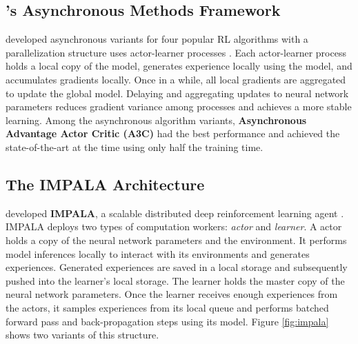 \subsection{'s Asynchronous Methods Framework}
\citeauthor{AsynchronousMethodsDeep_Mnih.Badia.ea_2016} developed asynchronous variants for four popular RL algorithms with a parallelization structure uses actor-learner processes \cite{AsynchronousMethodsDeep_Mnih.Badia.ea_2016}.
Each actor-learner process holds a local copy of the model, generates experience locally using the model, and accumulates gradients locally.
Once in a while, all local gradients are aggregated to update the global model.
Delaying and aggregating updates to neural network parameters reduces gradient variance among processes and achieves a more stable learning.
Among the asynchronous algorithm variants, \textbf{Asynchronous Advantage Actor Critic (A3C)} had the best performance and achieved the state-of-the-art at the time using only half the training time.

\subsection{The IMPALA Architecture} \label{sec:impala}
\citeauthor{IMPALAScalableDistributed_Espeholt.Soyer.ea_2018} developed \textbf{IMPALA}, a scalable distributed deep reinforcement learning agent \cite{IMPALAScalableDistributed_Espeholt.Soyer.ea_2018}.
IMPALA deploys two types of computation workers: \textit{actor} and \textit{learner}.
A actor holds a copy of the neural network parameters and the environment.
It performs model inferences locally to interact with its environments and generates experiences.
Generated experiences are saved in a local storage and subsequently pushed into the learner's local storage.
The learner holds the master copy of the neural network parameters.
Once the learner receives enough experiences from the actors, it samples experiences from its local queue and performs batched forward pass and back-propagation steps using its model.
Figure \ref{fig:impala} shows two variants of this structure.

